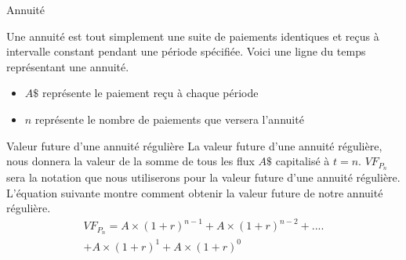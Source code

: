 \documentclass{beamer}
\begin{document}
\begin{frame}{Annuité}

Une annuité est tout simplement une suite de paiements identiques et reçus à intervalle constant pendant une période spécifiée. Voici une ligne du temps représentant une annuité.
\vspace{1cm}

  \vspace{0.5cm}
\begin{itemize}
\item $A\$$ représente le paiement reçu à chaque période 
\item $n$ représente le nombre de paiements que versera l'annuité
\end{itemize}
\end{frame}


\begin{frame}{Valeur future d'une annuité régulière}
La valeur future d'une annuité régulière, nous donnera la valeur de la somme de tous les flux $A\$$ capitalisé à $t=n$. $VF_{P_n}$ sera la notation que nous utiliserons pour la valeur future d'une annuité régulière. L'équation suivante montre comment obtenir la valeur future de notre annuité régulière.  
\begin{align*}
VF_{P_n} = A \times (1+r)^{n-1}+A \times (1+r)^{n-2}+....\\+A \times (1+r)^{1}+A \times (1+r)^{0}
\end{align*}
\end{frame}
\end{document}
